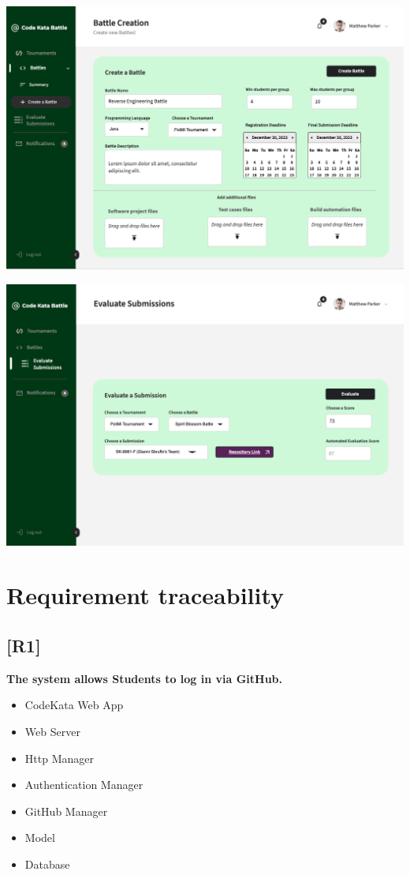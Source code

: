 \documentclass{article}
\begin{document}
\begin{center}
  \includegraphics[width=\linewidth]{mok3.png}
\label{fig:mk3}
\end{center}

\begin{center}
  \includegraphics[width=\linewidth]{mok4.png}
\label{fig:mk4}
\end{center}

\newpage
\section{Requirement traceability}
\subsection{[R1]}
\textbf{ The system allows Students to log in via GitHub.}
\begin{itemize}
\item CodeKata Web App
\item Web Server
\item Http Manager
\item Authentication Manager
\item GitHub Manager
\item Model
\item Database
\end{itemize}
\end{document}
